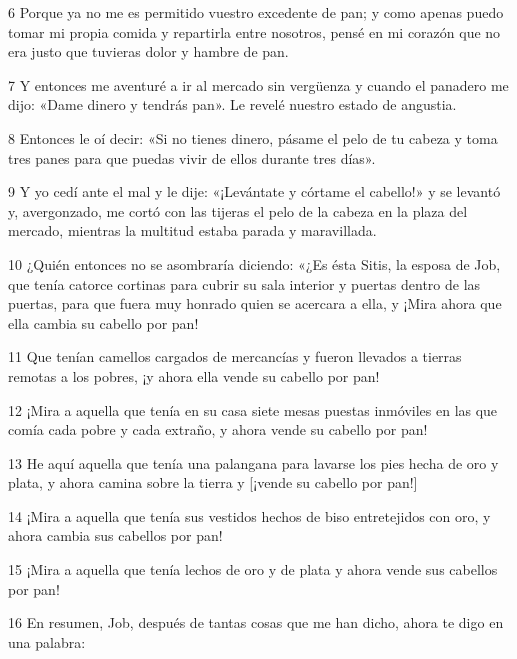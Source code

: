 \par 6 Porque ya no me es permitido vuestro excedente de pan; y como apenas puedo tomar mi propia comida y repartirla entre nosotros, pensé en mi corazón que no era justo que tuvieras dolor y hambre de pan.

\par 7 Y entonces me aventuré a ir al mercado sin vergüenza y cuando el panadero me dijo: «Dame dinero y tendrás pan». Le revelé nuestro estado de angustia.

\par 8 Entonces le oí decir: «Si no tienes dinero, pásame el pelo de tu cabeza y toma tres panes para que puedas vivir de ellos durante tres días».

\par 9 Y yo cedí ante el mal y le dije: «¡Levántate y córtame el cabello!» y se levantó y, avergonzado, me cortó con las tijeras el pelo de la cabeza en la plaza del mercado, mientras la multitud estaba parada y maravillada.

\par 10 ¿Quién entonces no se asombraría diciendo: «¿Es ésta Sitis, la esposa de Job, que tenía catorce cortinas para cubrir su sala interior y puertas dentro de las puertas, para que fuera muy honrado quien se acercara a ella, y ¡Mira ahora que ella cambia su cabello por pan!

\par 11 Que tenían camellos cargados de mercancías y fueron llevados a tierras remotas a los pobres, ¡y ahora ella vende su cabello por pan!

\par 12 ¡Mira a aquella que tenía en su casa siete mesas puestas inmóviles en las que comía cada pobre y cada extraño, y ahora vende su cabello por pan!

\par 13 He aquí aquella que tenía una palangana para lavarse los pies hecha de oro y plata, y ahora camina sobre la tierra y [¡vende su cabello por pan!]

\par 14 ¡Mira a aquella que tenía sus vestidos hechos de biso entretejidos con oro, y ahora cambia sus cabellos por pan!

\par 15 ¡Mira a aquella que tenía lechos de oro y de plata y ahora vende sus cabellos por pan!

\par 16 En resumen, Job, después de tantas cosas que me han dicho, ahora te digo en una palabra:

